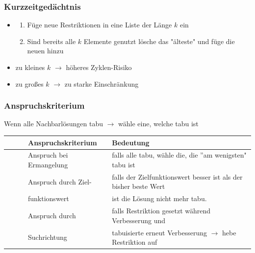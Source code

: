 \documentclass[12pt]{article}
\newcommand{\tabitem}{~~\llap{\textbullet}~~}
\begin{document}
			\subsubsection{Kurzzeitgedächtnis}	
				\begin{itemize}
					\item 
						\begin{enumerate}
							\item Füge neue Restriktionen in eine Liste der Länge $k$ ein
							\item Sind bereits alle $k$ Elemente genutzt lösche das "älteste" und füge die neuen hinzu
						\end{enumerate}
					\item zu kleines $k$ $\rightarrow$ höheres Zyklen-Risiko
					\item zu  großes $k$ $\rightarrow$ zu starke Einschränkung
				\end{itemize}
			\subsubsection{Anspruchskriterium}
				\begin{center}
					Wenn alle Nachbarlösungen tabu $\rightarrow$ wähle eine, welche tabu ist
				\end{center}
				\begin{tabular}{c l l}
					 & Anspruchskriterium & Bedeutung \\ \hline
					\tabitem & Anspruch bei Ermangelung & falls alle tabu, wähle die, die ''am wenigsten" tabu ist \\
					\tabitem & Anspruch durch Ziel- & falls der Zielfunktionswert besser ist als der bisher beste Wert\\
					 & funktionswert & ist die Lösung nicht mehr tabu. \\
					\tabitem & Anspruch durch & falls Restriktion gesetzt während Verbesserung und\\
					 & Suchrichtung &  tabuisierte erneut Verbesserung $\rightarrow$ hebe Restriktion auf\\
				\end{tabular}
\end{document}

